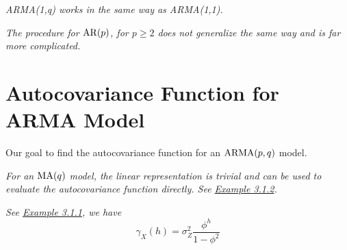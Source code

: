 \begin{example}[ARMA(1,q)]
    \emph{ARMA(1,q) works in the same way as ARMA(1,1).}
\end{example}

\begin{example}[AR(p)]
    \emph{
        The procedure for $\operatorname{AR}(p)$, for $p\geq 2$ does not generalize the same way and is far more complicated. 
    }
\end{example}

\section{Autocovariance Function for ARMA Model}

Our goal to find the autocovariance function for an $\operatorname{ARMA}(p,q)$ model. 

\begin{example}[MA(q)]
    \emph{
        For an $\operatorname{MA}(q)$ model, the linear representation is trivial and can be used to evaluate the autocovariance function directly. See \hyperref[ex:maq_acf]{Example 3.1.2}.
    }
\end{example}

\begin{example}[AR(1)]
    \emph{
        See \hyperref[ex:ar1_acf]{Example 3.1.1}, we have 
        \[\gamma_X(h) = \sigma_Z^2\frac{\phi^h}{1-\phi^2}\]
    }
\end{example}

